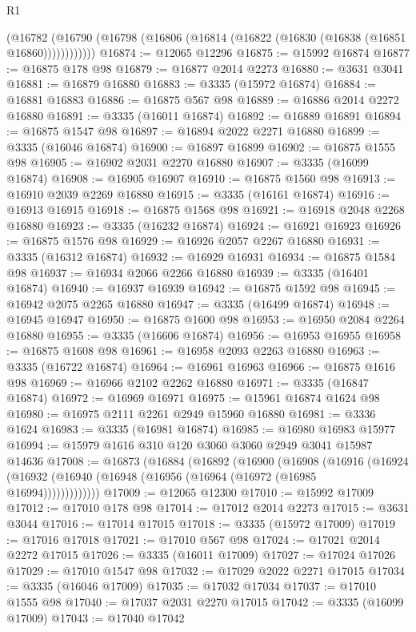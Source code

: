 \begin{lexlean}{R1}
\begin{coremodule}
          (@16782 (@16790 (@16798 (@16806 (@16814 (@16822 (@16830 (@16838 (@16851 @16860))))))))))))
@16874 := @12065 @12296
@16875 := @15992 @16874
@16877 := @16875 @178 @98
@16879 := @16877 @2014 @2273
@16880 := @3631 @3041
@16881 := @16879 @16880
@16883 := @3335 (@15972 @16874)
@16884 := @16881 @16883
@16886 := @16875 @567 @98
@16889 := @16886 @2014 @2272 @16880
@16891 := @3335 (@16011 @16874)
@16892 := @16889 @16891
@16894 := @16875 @1547 @98
@16897 := @16894 @2022 @2271 @16880
@16899 := @3335 (@16046 @16874)
@16900 := @16897 @16899
@16902 := @16875 @1555 @98
@16905 := @16902 @2031 @2270 @16880
@16907 := @3335 (@16099 @16874)
@16908 := @16905 @16907
@16910 := @16875 @1560 @98
@16913 := @16910 @2039 @2269 @16880
@16915 := @3335 (@16161 @16874)
@16916 := @16913 @16915
@16918 := @16875 @1568 @98
@16921 := @16918 @2048 @2268 @16880
@16923 := @3335 (@16232 @16874)
@16924 := @16921 @16923
@16926 := @16875 @1576 @98
@16929 := @16926 @2057 @2267 @16880
@16931 := @3335 (@16312 @16874)
@16932 := @16929 @16931
@16934 := @16875 @1584 @98
@16937 := @16934 @2066 @2266 @16880
@16939 := @3335 (@16401 @16874)
@16940 := @16937 @16939
@16942 := @16875 @1592 @98
@16945 := @16942 @2075 @2265 @16880
@16947 := @3335 (@16499 @16874)
@16948 := @16945 @16947
@16950 := @16875 @1600 @98
@16953 := @16950 @2084 @2264 @16880
@16955 := @3335 (@16606 @16874)
@16956 := @16953 @16955
@16958 := @16875 @1608 @98
@16961 := @16958 @2093 @2263 @16880
@16963 := @3335 (@16722 @16874)
@16964 := @16961 @16963
@16966 := @16875 @1616 @98
@16969 := @16966 @2102 @2262 @16880
@16971 := @3335 (@16847 @16874)
@16972 := @16969 @16971
@16975 := @15961 @16874 @1624 @98
@16980 := @16975 @2111 @2261 @2949 @15960 @16880
@16981 := @3336 @1624
@16983 := @3335 (@16981 @16874)
@16985 := @16980 @16983 @15977
@16994 := @15979 @1616 @310 @120 @3060 @3060 @2949 @3041 @15987 @14636
@17008 := @16873
    (@16884
      (@16892
        (@16900
          (@16908
            (@16916
              (@16924 (@16932 (@16940 (@16948 (@16956 (@16964 (@16972 (@16985 @16994)))))))))))))
@17009 := @12065 @12300
@17010 := @15992 @17009
@17012 := @17010 @178 @98
@17014 := @17012 @2014 @2273
@17015 := @3631 @3044
@17016 := @17014 @17015
@17018 := @3335 (@15972 @17009)
@17019 := @17016 @17018
@17021 := @17010 @567 @98
@17024 := @17021 @2014 @2272 @17015
@17026 := @3335 (@16011 @17009)
@17027 := @17024 @17026
@17029 := @17010 @1547 @98
@17032 := @17029 @2022 @2271 @17015
@17034 := @3335 (@16046 @17009)
@17035 := @17032 @17034
@17037 := @17010 @1555 @98
@17040 := @17037 @2031 @2270 @17015
@17042 := @3335 (@16099 @17009)
@17043 := @17040 @17042

\end{coremodule}
\end{lexlean}
